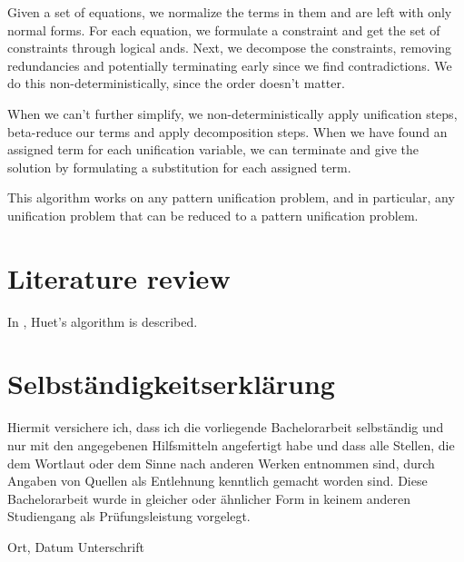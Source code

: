 \documentclass[twoside,12pt,a4paper]{article}
\begin{document}
Given a set of equations, we normalize the terms in them and are left with only normal forms. 
For each equation, we formulate a constraint and get the set of constraints through logical ands.
Next, we decompose the constraints, removing redundancies and potentially terminating early since we find contradictions.
We do this non-deterministically, since the order doesn't matter. %

When we can't further simplify, we non-deterministically apply unification steps, beta-reduce our terms and apply decomposition steps.
When we have found an assigned term for each unification variable, we can terminate and give the solution
by formulating a substitution for each assigned term.

This algorithm works on any pattern unification problem, and in particular, any unification problem that can be reduced to a pattern unification problem. %

\section{Literature review}\label{sec:Literature review}


\newpage
In \cite{DBLP:books/el/RV01/Dowek01}, Huet's algorithm is described. %








\cleardoublepage

\thispagestyle{empty}
\section*{Selbständigkeitserklärung}

Hiermit versichere ich, dass ich die vorliegende Bachelorarbeit 
selbständig und nur mit den angegebenen Hilfsmitteln angefertigt habe und dass alle Stellen, die dem Wortlaut oder dem 
Sinne nach anderen Werken entnommen sind, durch Angaben von Quellen als 
Entlehnung kenntlich gemacht worden sind. 
Diese Bachelorarbeit wurde in gleicher oder ähnlicher Form in keinem anderen 
Studiengang als Prüfungsleistung vorgelegt. 

\vskip 3cm

Ort, Datum	\hfill Unterschrift \hfill 


\end{document}
